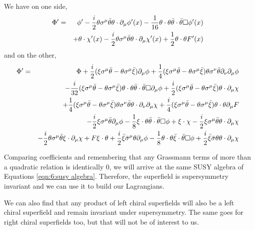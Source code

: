 We have on one side,
\begin{eqnarray}
    \Phi^\prime &=& \phi^\prime - \frac{i}{2} \theta \sigma^\mu \Bar{\theta} \theta \cdot \partial_\mu \phi^\prime(x) - \frac{1}{16} \theta \cdot \theta \Bar{\theta} \cdot \Bar{\theta} \Box \phi^\prime(x) \nonext
    && + \theta \cdot \chi^\prime(x) - \frac{i}{2} \theta \sigma^\mu \Bar{\theta} \theta\cdot \partial_\mu \chi^\prime (x) + \frac{1}{2} \theta \cdot \theta F^\prime (x)
    \label{eqn:12:left chiral transformed LHS}
\end{eqnarray}
and on the other,
\begin{eqnarray}
    \Phi^\prime &=& \Phi + \frac{i}{2} (\xi \sigma^\mu \Bar{\theta} - \theta \sigma^\mu \Bar{\xi}) \partial_\mu \phi + \frac{1}{4} (\xi \sigma^\mu \Bar{\theta} - \theta \sigma^\mu \Bar{\xi}) \theta \sigma^\nu \Bar{\theta} \partial_\nu \partial_\mu \phi \nonext 
    && - \frac{i}{32} (\xi\sigma^\mu \Bar{\theta} - \theta \sigma^\mu \Bar{\xi} ) \theta \cdot \theta \Bar{\theta} \cdot \Bar{\theta} \Box \partial_\mu \phi + \frac{i}{2} (\xi \sigma^\mu \Bar{\theta} - \theta \sigma^\mu \Bar{\xi}) \theta \cdot \partial_\mu \chi \nonext
    && + \frac{1}{4} (\xi \sigma^\mu \Bar{\theta} - \theta \sigma^\mu \Bar{\xi}) \theta \sigma^\nu \Bar{\theta} \theta \cdot \partial_\nu \partial_\mu \chi + \frac{i}{4} (\xi \sigma^\mu \Bar{\theta} - \theta \sigma^\mu \Bar{\xi}) \theta \cdot \theta \partial_\mu F \nonext
    && - \frac{i}{2} \xi \sigma^\mu \Bar{\theta} \partial_\mu \phi - \frac{1}{8} \xi\cdot\theta \Bar{\theta}\cdot\Bar{\theta}\Box \phi + \xi \cdot \chi - \frac{i}{2} \xi \sigma^\mu \Bar{\theta} \theta\cdot\partial_\mu \chi \nonext
    && - \frac{i}{2} \theta \sigma^\mu \Bar{\theta} \xi \cdot \partial_\mu \chi + F \xi \cdot \theta + \frac{i}{2} \Bar{\xi} \Bar{\sigma}^\mu \theta \partial_\mu \phi - \frac{1}{8} \theta\cdot \theta \Bar{\xi} \cdot \Bar{\theta} \Box \phi + \frac{i}{2} \Bar{\xi} \Bar{\sigma} \theta \theta \cdot \partial_\mu \chi
    \label{eqn:12:left chiral transformed RHS}
\end{eqnarray}

Comparing coefficients and remembering that any Grassmann terms of more than a quadratic relation is identically $0$, we will arrive at the same SUSY algebra of Equations \ref{eqn:6:susy algebra}. Therefore, the superfield is supersymmetry invariant and we can use it to build our Lagrangians.

We can also find that any product of left chiral superfields will also be a left chiral superfield and remain invariant under supersymmetry. The same goes for right chiral superfields too, but that will not be of interest to us.


